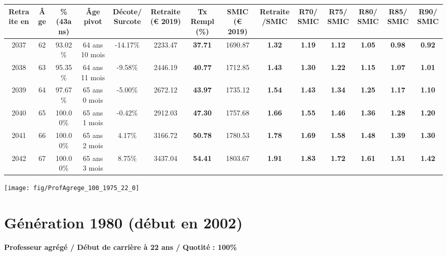\begin{adjustbox}{max width=\textwidth} 
\begin{tabular}[htb]{|c|c||c|c|c||c|c||c|c||c|c|c|c|c|} 
\hline 
 Retraite en &  Âge &  \%(43ans) &  Âge pivot &  Décote/Surcote &  Retraite (\euro{} 2019) &  Tx Rempl(\%) &  SMIC (\euro{} 2019) &  Retraite/SMIC &  R70/SMIC &  R75/SMIC &  R80/SMIC &  R85/SMIC &  R90/SMIC \\ 
\hline \hline 
 2037 &  62 &  93.02\% &  64 ans 10 mois &  -14.17\% &  2233.47 &  {\bf 37.71} &  1690.87 &  {\bf 1.32} &  {\bf 1.19} &  {\bf 1.12} &  {\bf 1.05} &  {\bf {\color{red} 0.98}} &  {\bf {\color{red} 0.92}} \\ 
\hline 
 2038 &  63 &  95.35\% &  64 ans 11 mois &  -9.58\% &  2446.19 &  {\bf 40.77} &  1712.85 &  {\bf 1.43} &  {\bf 1.30} &  {\bf 1.22} &  {\bf 1.15} &  {\bf 1.07} &  {\bf 1.01} \\ 
\hline 
 2039 &  64 &  97.67\% &  65 ans 0 mois &  -5.00\% &  2672.12 &  {\bf 43.97} &  1735.12 &  {\bf 1.54} &  {\bf 1.43} &  {\bf 1.34} &  {\bf 1.25} &  {\bf 1.17} &  {\bf 1.10} \\ 
\hline 
 2040 &  65 &  100.00\% &  65 ans 1 mois &  -0.42\% &  2912.03 &  {\bf 47.30} &  1757.68 &  {\bf 1.66} &  {\bf 1.55} &  {\bf 1.46} &  {\bf 1.36} &  {\bf 1.28} &  {\bf 1.20} \\ 
\hline 
 2041 &  66 &  100.00\% &  65 ans 2 mois &  4.17\% &  3166.72 &  {\bf 50.78} &  1780.53 &  {\bf 1.78} &  {\bf 1.69} &  {\bf 1.58} &  {\bf 1.48} &  {\bf 1.39} &  {\bf 1.30} \\ 
\hline 
 2042 &  67 &  100.00\% &  65 ans 3 mois &  8.75\% &  3437.04 &  {\bf 54.41} &  1803.67 &  {\bf 1.91} &  {\bf 1.83} &  {\bf 1.72} &  {\bf 1.61} &  {\bf 1.51} &  {\bf 1.42} \\ 
\hline 
\hline 
\end{tabular} 
\end{adjustbox} 
 
 \vspace{0.1cm} 

 {\hspace{-2.2cm}\texttt{[image: fig/ProfAgrege\_100\_1975\_22\_0]}} 

\newpage 
 
\section{Génération 1980 (début en 2002)\label{ProfAgrege_100_1980_22_0}} 
 
{\bf \noindent Professeur agrégé / Début de carrière à 22 ans / Quotité : 100\%}  ~ 

